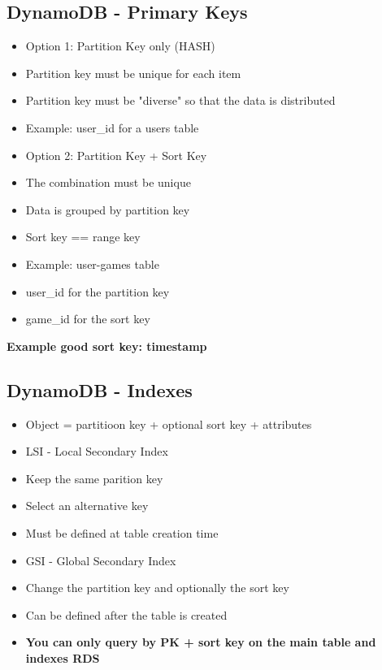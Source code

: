 \subsection{DynamoDB - Primary Keys}
\begin{itemize}
    \item Option 1: Partition Key only (HASH)
    \item Partition key must be unique for each item
    \item Partition key must be "diverse" so that the data is distributed
    \item Example: user_id for a users table
\end{itemize}


\begin{itemize}
    \item Option 2: Partition Key + Sort Key
    \item The combination must be unique
    \item Data is grouped by partition key
    \item Sort key == range key
    \item Example: user-games table
    \item user_id for the partition key
    \item game_id for the sort key
\end{itemize}

\item \textbf{Example good sort key: timestamp}

\subsection{DynamoDB - Indexes}
\begin{itemize}
    \item Object = partitioon key + optional sort key + attributes
    \item LSI - Local Secondary Index
    \item Keep the same parition key
    \item Select an alternative key
    \item Must be defined at table creation time
    \item GSI - Global Secondary Index
    \item Change the partition key and optionally the sort key
    \item Can be defined after the table is created
    \item \textbf{You can only query by PK + sort key on the main table and indexes \neq RDS}
\end{itemize}


